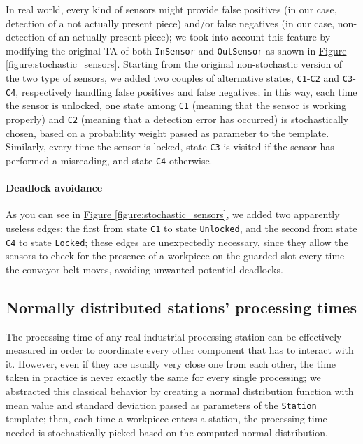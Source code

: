\documentclass[a4paper]{article}
\newcommand{\figureref}[1]{\textsf{\hyperref[#1]{Figure \ref*{#1}}}}
\begin{document}
    In real world, every kind of sensors might provide false positives (in our case, detection of a not actually present piece) and/or false negatives (in our case, non-detection of an actually present piece); we took into account this feature by modifying the original TA of both \texttt{InSensor} and \texttt{OutSensor} as shown in \figureref{figure:stochastic_sensors}. Starting from the original non-stochastic version of the two type of sensors, we added two couples of alternative states, \texttt{C1}-\texttt{C2} and \texttt{C3}-\texttt{C4}, respectively handling false positives and false negatives; in this way, each time the sensor is unlocked, one state among \texttt{C1} (meaning that the sensor is working properly) and \texttt{C2} (meaning that a detection error has occurred) is stochastically chosen, based on a probability weight passed as parameter to the template. Similarly, every time the sensor is locked, state \texttt{C3} is visited if the sensor has performed a misreading, and state \texttt{C4} otherwise.

    \paragraph{Deadlock avoidance} As you can see in \figureref{figure:stochastic_sensors}, we added two apparently useless edges: the first from state \texttt{C1} to state \texttt{Unlocked}, and the second from state \texttt{C4} to state \texttt{Locked}; these edges are unexpectedly necessary, since they allow the sensors to check for the presence of a workpiece on the guarded slot every time the conveyor belt moves, avoiding unwanted potential deadlocks.

    \subsection{Normally distributed stations' processing times}

    The processing time of any real industrial processing station can be effectively measured in order to coordinate every other component that has to interact with it. However, even if they are usually very close one from each other, the time taken in practice is never exactly the same for every single processing; we abstracted this classical behavior by creating a normal distribution function with mean value and standard deviation passed as parameters of the \texttt{Station} template; then, each time a workpiece enters a station, the processing time needed is stochastically picked based on the computed normal distribution.
\end{document}
